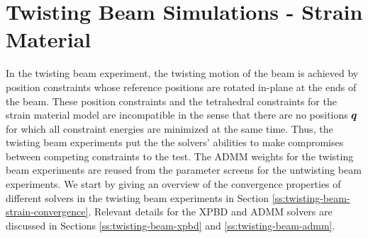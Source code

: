 \section{Twisting Beam Simulations - Strain Material}\label{ss:twisting-beam-strain}
In the twisting beam experiment, the twisting motion of the beam is achieved by position constraints whose reference positions are rotated in-plane at the 
ends of the beam. These position constraints and the tetrahedral constraints for the strain material model are incompatible in the sense that there are no 
positions $\bm{q}$ for which all constraint energies are minimized at the same time. Thus, the twisting beam experiments put the the solvers' abilities 
to make compromises between competing constraints to the test. The ADMM weights for the twisting beam experiments are reused from the parameter screens 
for the untwisting beam experiments. We start by giving an overview of the convergence properties of different solvers in the twisting beam experiments in 
Section \ref{ss:twisting-beam-strain-convergence}. Relevant details for the XPBD and ADMM solvers are discussed in Sections \ref{ss:twisting-beam-xpbd} and 
\ref{ss:twisting-beam-admm}.

